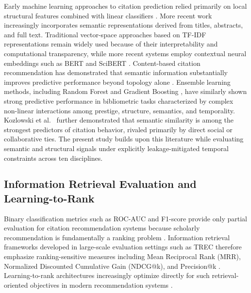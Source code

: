 \documentclass[11pt,a4paper]{article}
\begin{document}
Early machine learning approaches to citation prediction relied primarily on local structural features combined with linear classifiers \citep{liben2007link}. More recent work increasingly incorporates semantic representations derived from titles, abstracts, and full text. Traditional vector-space approaches based on TF-IDF representations remain widely used because of their interpretability and computational transparency, while more recent systems employ contextual neural embeddings such as BERT and SciBERT \citep{devlin2019bert}. Content-based citation recommendation has demonstrated that semantic information substantially improves predictive performance beyond topology alone \citep{bhagavatula2018content}. Ensemble learning methods, including Random Forest \citep{breiman2001random} and Gradient Boosting \citep{natekin2013gradient}, have similarly shown strong predictive performance in bibliometric tasks characterized by complex non-linear interactions among prestige, structure, semantics, and temporality. Kozlowski et al.\ \citep{kozlowski2025citation} further demonstrated that semantic similarity is among the strongest predictors of citation behavior, rivaled primarily by direct social or collaborative ties. The present study builds upon this literature while evaluating semantic and structural signals under explicitly leakage-mitigated temporal constraints across ten disciplines.

\subsection{Information Retrieval Evaluation and Learning-to-Rank}

Binary classification metrics such as ROC-AUC and F1-score provide only partial evaluation for citation recommendation systems because scholarly recommendation is fundamentally a ranking problem \citep{manning2008introduction, powers2011evaluation}. Information retrieval frameworks developed in large-scale evaluation settings such as TREC \citep{voorhees2005trec} therefore emphasize ranking-sensitive measures including Mean Reciprocal Rank (MRR), Normalized Discounted Cumulative Gain (NDCG@k), and Precision@k \citep{jarvelin2002cumulated}. Learning-to-rank architectures increasingly optimize directly for such retrieval-oriented objectives in modern recommendation systems \citep{liu2009learning}.
\end{document}
